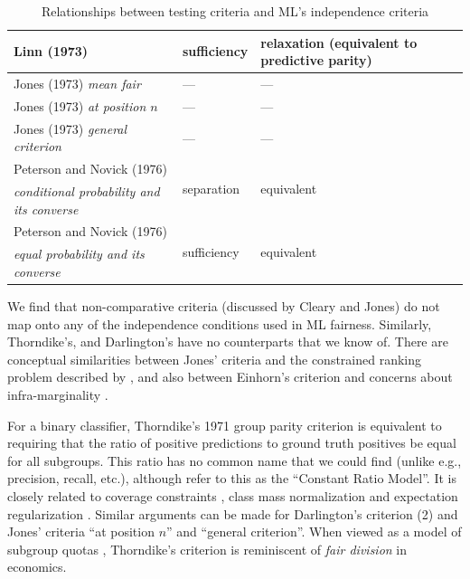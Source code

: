 \documentclass[sigconf,letterpaper,9pt]{acmart}
\begin{document}
\begin{table}
\begin{tabular}{p{5cm}p{3.25cm}p{8.5cm}}
\hline
Linn (1973) & {\sc sufficiency} & relaxation (equivalent to predictive parity)\\
\hline
Jones (1973) {\em mean fair} & --- & --- \\
Jones (1973) {\em at position $n$} & --- & --- \\
Jones (1973) {\em general criterion} & --- & --- \\
\hline
Peterson and Novick (1976)  & \multirow{2}{*}{{\sc separation}} & \multirow{2}{*}{equivalent} \\
{\em conditional probability and its converse} && \\
Peterson and Novick (1976)  & \multirow{2}{*}{{\sc sufficiency}} & \multirow{2}{*}{equivalent} \\
{\em equal probability and its converse} && \\
\bottomrule
\end{tabular}
\caption{Relationships between testing criteria and ML's independence criteria}
\label{tab:fairness_relationships}
\vspace{-1.25em}
\end{table}

We find that non-comparative criteria (discussed by Cleary and Jones) do not map
onto any of the independence
conditions used in ML fairness. Similarly, Thorndike's,
and Darlington's  have no counterparts that we know of.
There are conceptual similarities between Jones' criteria 
and the constrained ranking problem described by \cite{celis2017ranking},
and also between Einhorn's criterion and  concerns 
about infra-marginality \cite{simoiu2017problem}.


For a binary classifier,
Thorndike's 1971 group parity criterion is equivalent to requiring that the ratio
of positive predictions to ground truth positives be equal for all subgroups.
This ratio has no common name that we could find
(unlike e.g., precision, recall, etc.), although \cite{petersen1976evaluation} refer to this as the ``Constant Ratio Model''.  %
It is closely related to coverage constraints \cite{goh2016satisfying},
class mass normalization
\cite{zhu2003semi} and expectation regularization \cite{mann2007simple}.
Similar arguments can be made for Darlington's criterion (2) and Jones' criteria ``at position $n$'' and ``general
criterion''. When viewed as a model of subgroup quotas
\cite{hunter1976critical}, Thorndike's criterion is reminiscent of {\it fair division} in economics.
\end{document}
